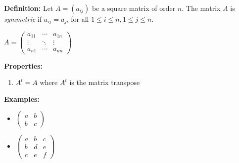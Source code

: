 \documentclass{article}
\begin{document}

\textbf{Definition:} \newline Let $A=(a_{ij})$ be a square matrix of
order $n$.  The matrix $A$ is \emph{symmetric} if $a_{ij} = a_{ji}$
for all $1 \leq i \leq n, 1 \leq j \leq n$.
\begin{center}$A =
\begin{pmatrix}
  a_{11} & \cdots & a_{1n} \\
  \vdots & \ddots & \vdots \\
  a_{n1} & \cdots & a_{nn}
\end{pmatrix}$
\end{center}

\textbf{Properties:}
\begin{enumerate}
  \item $A^t = A$ where $A^t$ is the matrix transpose
\end{enumerate}

\textbf{Examples:}
\begin{itemize}
  \item $\begin{pmatrix}
    a & b \\
    b & c 
  \end{pmatrix}$
  \item $\begin{pmatrix}
    a & b & c \\
    b & d & e \\
    c & e & f 
  \end{pmatrix}$
\end{itemize}
\end{document}
